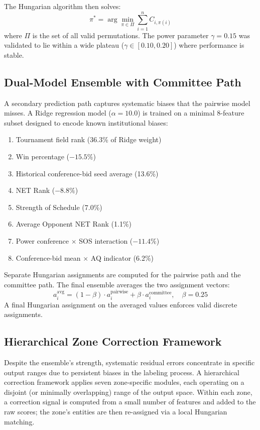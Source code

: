 \documentclass[conference]{IEEEtran}
\begin{document}
The Hungarian algorithm then solves:
\begin{equation}
\pi^* = \arg\min_{\pi \in \Pi} \sum_{i=1}^{n} C_{i,\pi(i)}
\label{eq:hungarian}
\end{equation}
where $\Pi$ is the set of all valid permutations. The power parameter $\gamma = 0.15$ was validated to lie within a wide plateau ($\gamma \in [0.10, 0.20]$) where performance is stable.

\subsection{Dual-Model Ensemble with Committee Path}

A secondary prediction path captures systematic biases that the pairwise model misses. A Ridge regression model ($\alpha = 10.0$) is trained on a minimal 8-feature subset designed to encode known institutional biases:

\begin{enumerate}
\item Tournament field rank (36.3\% of Ridge weight)
\item Win percentage ($-15.5\%$)
\item Historical conference-bid seed average (13.6\%)
\item NET Rank ($-8.8\%$)
\item Strength of Schedule (7.0\%)
\item Average Opponent NET Rank (1.1\%)
\item Power conference $\times$ SOS interaction ($-11.4\%$)
\item Conference-bid mean $\times$ AQ indicator (6.2\%)
\end{enumerate}

Separate Hungarian assignments are computed for the pairwise path and the committee path. The final ensemble averages the two assignment vectors:
\begin{equation}
a_i^{\text{avg}} = (1 - \beta) \cdot a_i^{\text{pairwise}} + \beta \cdot a_i^{\text{committee}}, \quad \beta = 0.25
\label{eq:dual_blend}
\end{equation}
A final Hungarian assignment on the averaged values enforces valid discrete assignments.

\subsection{Hierarchical Zone Correction Framework}

Despite the ensemble's strength, systematic residual errors concentrate in specific output ranges due to persistent biases in the labeling process. A hierarchical correction framework applies seven zone-specific modules, each operating on a disjoint (or minimally overlapping) range of the output space. Within each zone, a correction signal is computed from a small number of features and added to the raw scores; the zone's entities are then re-assigned via a local Hungarian matching.
\end{document}
